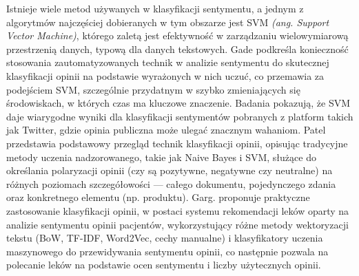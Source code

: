 \documentclass[runningheads]{llncs}
\begin{document}
Istnieje wiele metod używanych w klasyfikacji sentymentu, a jednym z algorytmów najczęściej dobieranych w tym obszarze jest SVM \textit{(ang. Support Vector Machine)}, którego zaletą jest efektywność w zarządzaniu wielowymiarową przestrzenią danych, typową dla danych tekstowych\cite{putri2021analysis}\cite{nurqoulby2024analysis}. Gade podkreśla konieczność stosowania zautomatyzowanych technik w analizie sentymentu do skutecznej klasyfikacji opinii na podstawie wyrażonych w nich uczuć, co przemawia za podejściem SVM, szczególnie przydatnym w szybko zmieniających się środowiskach, w których czas ma kluczowe znaczenie\cite{10.22214/ijraset.2023.53030}. Badania pokazują, że SVM daje wiarygodne wyniki dla klasyfikacji sentymentów pobranych z platform takich jak Twitter, gdzie opinia publiczna może ulegać znacznym wahaniom\cite{10.32734/jocai.v8.i2-16317}\cite{10.31937/ti.v14i1.2384}. Patel\cite{10.5120/ijca2015907218} przedstawia podstawowy przegląd technik klasyfikacji opinii, opisując tradycyjne metody uczenia nadzorowanego, takie jak Naive Bayes i SVM, służące do określania polaryzacji opinii (czy są pozytywne, negatywne czy neutralne) na różnych poziomach szczegółowości — całego dokumentu, pojedynczego zdania oraz konkretnego elementu (np. produktu). Garg.\cite{10.1109/confluence51648.2021.9377188} proponuje praktyczne zastosowanie klasyfikacji opinii, w postaci systemu rekomendacji leków oparty na analizie sentymentu opinii pacjentów, wykorzystujący różne metody wektoryzacji tekstu (BoW, TF-IDF, Word2Vec, cechy manualne) i klasyfikatory uczenia maszynowego do przewidywania sentymentu opinii, co następnie pozwala na polecanie leków na podstawie ocen sentymentu i liczby użytecznych opinii.

\end{document}
